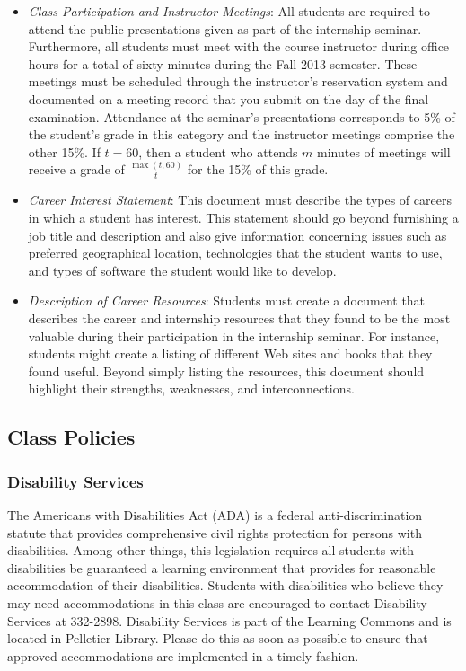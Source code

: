 \begin{itemize}

	\item {\em Class Participation and Instructor Meetings}: All students are required to attend the public
		presentations given as part of the internship seminar.  Furthermore, all students must meet with the
		course instructor during office hours for a total of sixty minutes during the Fall 2013 semester.  These
		meetings must be scheduled through the instructor's reservation system and documented on a meeting record that
		you submit on the day of the final examination. Attendance at the seminar's presentations corresponds to 5\% of
		the student's grade in this category and the instructor meetings comprise the other 15\%. If $t=60$, then a
		student who attends $m$ minutes of meetings will receive a grade of $\frac{\max{(t,60)}}{t}$ for the 15\%
		of this grade.
		
	\item {\em Career Interest Statement}: This document must describe the types of careers in which a student has
		interest. This statement should go beyond furnishing a job title and description and also give
		information concerning issues such as preferred geographical location, technologies that the student wants to
		use, and types of software the student would like to develop. 	

	\item {\em Description of Career Resources}:  Students must create a document that describes the career and
		internship resources that they found to be the most valuable during their participation in the internship
		seminar. For instance, students might create a listing of different Web sites and books that they found useful. 
		Beyond simply listing the resources, this document should highlight their strengths, weaknesses, and interconnections. 		

\end{itemize}

\subsection*{Class Policies}

\subsubsection*{Disability Services}

The Americans with Disabilities Act (ADA) is a federal anti-discrimination statute that provides comprehensive civil
rights protection for persons with disabilities.  Among other things, this legislation requires all students with
disabilities be guaranteed a learning environment that provides for reasonable accommodation of their disabilities.
Students with disabilities who believe they may need accommodations in this class are encouraged to contact Disability
Services at 332-2898.  Disability Services is part of the Learning Commons and is located in Pelletier Library.
Please do this as soon as possible to ensure that approved accommodations are implemented in a timely fashion.

